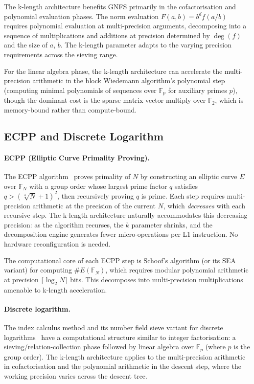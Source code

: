 \documentclass[11pt,a4paper]{article}
\begin{document}
The k-length architecture benefits GNFS primarily in the cofactorisation
and polynomial evaluation phases.  The norm evaluation
$F(a,b) = b^d f(a/b)$ requires polynomial evaluation at multi-precision
arguments, decomposing into a sequence of multiplications and additions at
precision determined by $\deg(f)$ and the size of $a$, $b$.  The k-length
parameter adapts to the varying precision requirements across the sieving
range.

For the linear algebra phase, the k-length architecture can accelerate the
multi-precision arithmetic in the block Wiedemann algorithm's polynomial
step (computing minimal polynomials of sequences over $\mathbb{F}_p$ for
auxiliary primes $p$), though the dominant cost is the sparse matrix-vector
multiply over $\mathbb{F}_2$, which is memory-bound rather than
compute-bound.

\subsection{ECPP and Discrete Logarithm}
\label{sec:ecpp-dlog}

\paragraph{ECPP (Elliptic Curve Primality Proving).}
The ECPP algorithm~\cite{atkin1993ecpp} proves primality of $N$ by
constructing an elliptic curve $E$ over $\mathbb{F}_N$ with a group order
whose largest prime factor $q$ satisfies $q > (\sqrt[4]{N} + 1)^2$, then
recursively proving $q$ is prime.  Each step requires multi-precision
arithmetic at the precision of the current $N$, which \emph{decreases}
with each recursive step.  The k-length architecture naturally accommodates
this decreasing precision: as the algorithm recurses, the $k$ parameter
shrinks, and the decomposition engine generates fewer micro-operations per
L1 instruction.  No hardware reconfiguration is needed.

The computational core of each ECPP step is Schoof's algorithm (or its
SEA variant) for computing $\#E(\mathbb{F}_N)$, which requires modular
polynomial arithmetic at precision $\lceil \log_2 N \rceil$ bits.  This
decomposes into multi-precision multiplications amenable to k-length
acceleration.

\paragraph{Discrete logarithm.}
The index calculus method and its number field sieve variant for discrete
logarithms~\cite{pollard1978} have a computational structure similar to
integer factorisation: a sieving/relation-collection phase followed by
linear algebra over $\mathbb{F}_p$ (where $p$ is the group order).  The
k-length architecture applies to the multi-precision arithmetic in
cofactorisation and the polynomial arithmetic in the descent step, where
the working precision varies across the descent tree.
\end{document}
